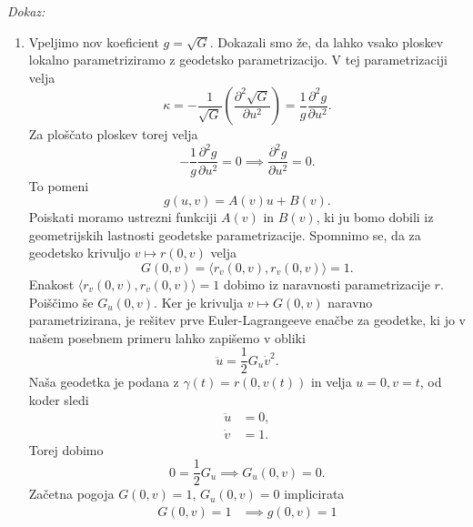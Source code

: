 \noindent
{\em Dokaz:\/}
\begin{enumerate}
    \item Vpeljimo nov koeficient $g = \sqrt{G}$. Dokazali smo že, da lahko vsako ploskev lokalno parametriziramo z geodetsko parametrizacijo. V tej parametrizaciji velja \begin{equation*}
        \kappa = - \frac{1}{\sqrt{G}} \left( \frac{ \partial^{2} \sqrt{G}  }{ \partial u^{2} }  \right) = \frac{1}{g} \frac{ \partial^{2} g }{ \partial u^{2} } .
        \end{equation*}  
        Za ploščato ploskev torej velja \begin{equation*}
        -\frac{1}{g} \frac{ \partial^{2} g }{ \partial u^{2} } = 0 \implies \frac{ \partial^{2} g }{ \partial u^{2} } = 0. 
        \end{equation*}
        To pomeni \begin{equation*}
        g(u,v) = A(v) u + B(v).
        \end{equation*}  
        Poiskati moramo ustrezni funkciji $A(v)$ in $B(v)$, ki ju bomo dobili iz geometrijskih lastnosti geodetske parametrizacije. Spomnimo se, da za
        geodetsko krivuljo $v \mapsto r(0,v)$ velja \begin{equation*}
        G(0, v) = \langle r_v(0,v), r_v(0,v) \rangle = 1. 
        \end{equation*}  
        Enakost $\langle r_v(0,v), r_v(0,v) \rangle = 1$ dobimo iz naravnosti parametrizacije $r$. Poiščimo še $G_u(0, v)$. Ker je krivulja
        $v \mapsto  G(0, v)$ naravno parametrizirana, je rešitev prve Euler-Lagrangeeve enačbe za geodetke, ki jo v našem posebnem primeru lahko zapišemo v obliki \begin{equation*}
        \ddot{u} = \frac{1}{2} G_u \dot{v}^2. 
        \end{equation*}  
        Naša geodetka je podana z $\gamma(t) = r(0, v(t))$ in velja $u = 0, v = t$, od koder sledi \begin{align*}
            \ddot{u} &= 0, \\
            \dot{v} &= 1.
        \end{align*}
        Torej dobimo \begin{equation*}
        0 = \frac{1}{2} G_u \implies G_u(0,v) = 0.
        \end{equation*}  
        Začetna pogoja $G(0, v) = 1$, $G_u(0,v) = 0$ implicirata \begin{align*}
            G(0,v)  = 1 &\implies g(0,v) = 1 \\

\end{align*}
\end{enumerate}

